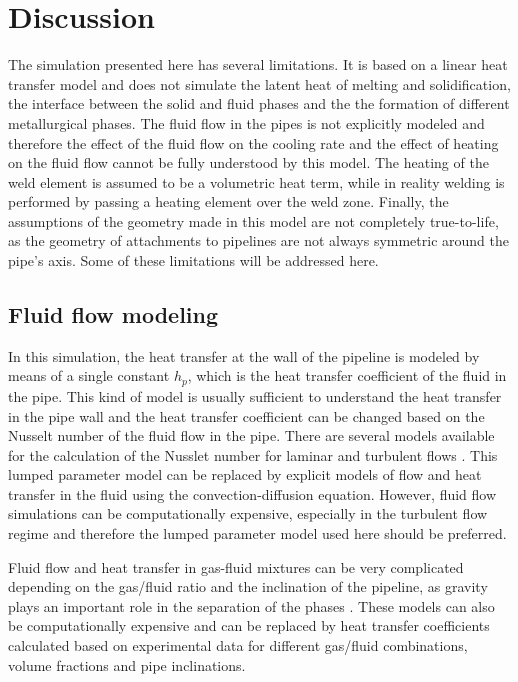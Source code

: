 \documentclass{article}
\makeatletter
\newcommand{\autocitel}[1]{\autocite{#1}\checknextarg}
\newcommand{\checknextarg}{\@ifnextchar\bgroup{\gobblenextarg}{}}
\newcommand{\gobblenextarg}[1]{$^,$\autocite{#1}\@ifnextchar\bgroup{\gobblenextarg}{}}
\makeatother
\begin{document}
\section{Discussion}
The simulation presented here has several limitations. It is based on a linear heat transfer model and does not simulate the latent heat of melting and solidification, the interface between the solid and fluid phases and the the formation of different metallurgical phases. The fluid flow in the pipes is not explicitly modeled and therefore the effect of the fluid flow on the cooling rate and the effect of heating on the fluid flow cannot be fully understood by this model. The heating of the weld element is assumed to be a volumetric heat term, while in reality welding is performed by passing a heating element over the weld zone. Finally, the assumptions of the geometry made in this model are not completely true-to-life, as the geometry of attachments to pipelines are not always symmetric around the pipe's axis. Some of these limitations will be addressed here. 

\subsection{Fluid flow modeling}
In this simulation, the heat transfer at the wall of the pipeline is modeled by means of a single constant $h_p$, which is the heat transfer coefficient of the fluid in the pipe. This kind of model is usually sufficient to understand the heat transfer in the pipe wall and the heat transfer coefficient can be changed based on the Nusselt number of the fluid flow in the pipe. There are several models available for the calculation of the Nusslet number for laminar and turbulent flows \autocitel{nagy2018basic}. This lumped parameter model can be replaced by explicit models of flow and heat transfer in the fluid using the convection-diffusion equation. However, fluid flow simulations can be computationally expensive, especially in the turbulent flow regime and therefore the lumped parameter model used here should be preferred.

Fluid flow and heat transfer in gas-fluid mixtures can be very complicated depending on the gas/fluid ratio and the inclination of the pipeline, as gravity plays an important role in the separation of the phases \autocitel{zhang2006unified}. These models can also be computationally expensive and can be replaced by heat transfer coefficients calculated based on experimental data for different gas/fluid combinations, volume fractions and pipe inclinations\autocitel{kim1999comparison}{kim2002heat}{ghajar2010importance}. 
 
\end{document}
